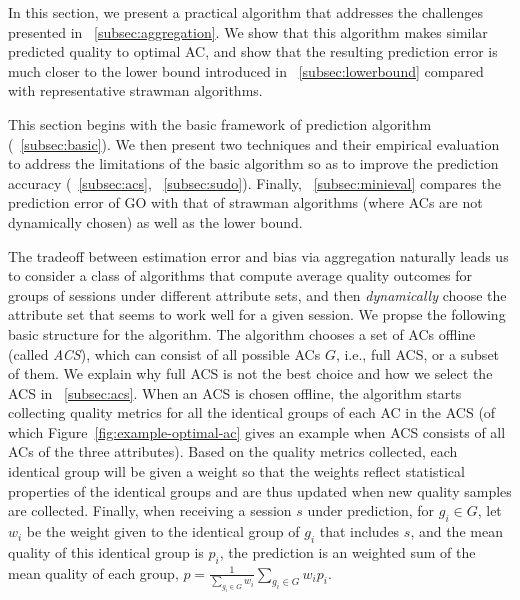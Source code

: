 \label{sec:prediction}
In this section, we present a practical algorithm that addresses the challenges presented in \Section~\ref{subsec:aggregation}. We show that this algorithm makes similar predicted quality to optimal AC, and show that the resulting prediction error is much closer to the lower bound introduced in \Section~\ref{subsec:lowerbound} compared with representative strawman algorithms.

This section begins with the basic framework of prediction algorithm (\Section~\ref{subsec:basic}). We then present two techniques and their empirical evaluation to address the limitations of the basic algorithm so as to improve the prediction accuracy (\Section~\ref{subsec:acs}, \Section~\ref{subsec:sudo}). Finally, \Section~\ref{subsec:minieval} compares the prediction error of GO with that of strawman algorithms (where ACs are not dynamically chosen) as well as the lower bound.


\label{subsec:basic}
The tradeoff between estimation error and bias via aggregation naturally leads us to consider a class of algorithms that compute average quality outcomes for groups of sessions under different attribute sets, and then {\it dynamically} choose the attribute set that seems to work well for a given session. 
We propse the following basic structure for the algorithm. The algorithm chooses a set of ACs offline (called {\it ACS}), which can consist of all possible ACs $G$, i.e., full ACS, or a subset of them. 
We explain why full ACS is not the best choice and how we select the ACS in \Section~\ref{subsec:acs}. When an ACS is chosen offline, the algorithm starts collecting quality metrics for all the identical groups of each AC in the ACS 
(of which Figure~\ref{fig:example-optimal-ac} gives an example when ACS consists of all ACs of the three attributes). Based on the quality metrics collected, each identical group will be given a weight so that the weights reflect statistical properties of the identical groups and are thus updated when new quality samples are collected.
Finally, when receiving a session $s$ under prediction, for $g_i\in G$, let $w_i$ be the weight given to the identical group of $g_i$ that includes $s$, and the mean quality of this identical group is $p_i$,
the prediction is an weighted sum of the mean quality of each group, $p=\frac{1}{\sum_{g_i\in G} w_i}\sum_{g_i\in G} w_ip_i$.


